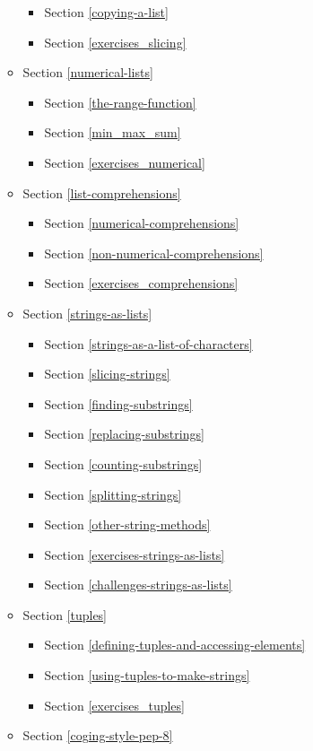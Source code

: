 \documentclass[11pt]{article}
\providecommand{\tightlist}{%
      \setlength{\itemsep}{0pt}\setlength{\parskip}{0pt}}
\begin{document}
\begin{itemize}
\begin{itemize}
    \begin{itemize}
    \tightlist
    \item
      Section \ref{copying-a-list}
    \item
      Section \ref{exercises_slicing}
    \end{itemize}
  \item
    Section \ref{numerical-lists}

    \begin{itemize}
    \tightlist
    \item
      Section \ref{the-range-function}
    \item
      Section \ref{min_max_sum}
    \item
      Section \ref{exercises_numerical}
    \end{itemize}
  \item
    Section \ref{list-comprehensions}

    \begin{itemize}
    \tightlist
    \item
      Section \ref{numerical-comprehensions}
    \item
      Section \ref{non-numerical-comprehensions}
    \item
      Section \ref{exercises_comprehensions}
    \end{itemize}
  \item
    Section \ref{strings-as-lists}

    \begin{itemize}
    \tightlist
    \item
      Section \ref{strings-as-a-list-of-characters}
    \item
      Section \ref{slicing-strings}
    \item
      Section \ref{finding-substrings}
    \item
      Section \ref{replacing-substrings}
    \item
      Section \ref{counting-substrings}
    \item
      Section \ref{splitting-strings}
    \item
      Section \ref{other-string-methods}
    \item
      Section \ref{exercises-strings-as-lists}
    \item
      Section \ref{challenges-strings-as-lists}
    \end{itemize}
  \item
    Section \ref{tuples}

    \begin{itemize}
    \tightlist
    \item
      Section \ref{defining-tuples-and-accessing-elements}
    \item
      Section \ref{using-tuples-to-make-strings}
    \item
      Section \ref{exercises_tuples}
    \end{itemize}
  \item
    Section \ref{coging-style-pep-8}


\end{itemize}
\end{itemize}
\end{document}
